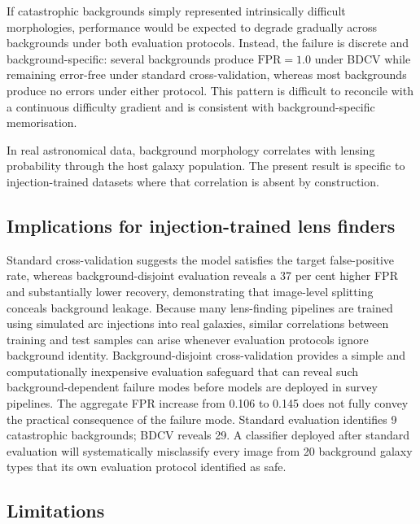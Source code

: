 \documentclass[fleqn,usenatbib]{mnras}
\begin{document}
If catastrophic backgrounds simply represented intrinsically difficult
morphologies, performance would be expected to degrade gradually across
backgrounds under both evaluation protocols. Instead, the failure is
discrete and background-specific: several backgrounds produce
$\mathrm{FPR} = 1.0$ under BDCV while remaining error-free under
standard cross-validation, whereas most backgrounds produce no errors
under either protocol. This pattern is difficult to reconcile with a
continuous difficulty gradient and is consistent with
background-specific memorisation.

In real astronomical data, background morphology correlates with lensing
probability through the host galaxy population. The present result is
specific to injection-trained datasets where that correlation is absent
by construction.

\subsection{Implications for injection-trained lens finders}
\label{sec:implications}

Standard cross-validation suggests the model satisfies the target
false-positive rate, whereas background-disjoint evaluation reveals a 37
per cent higher FPR and substantially lower recovery, demonstrating that
image-level splitting conceals background leakage. Because many
lens-finding pipelines are trained using simulated arc injections into
real galaxies, similar correlations between training and test samples can
arise whenever evaluation protocols ignore background identity.
Background-disjoint cross-validation provides a simple and
computationally inexpensive evaluation safeguard that can reveal such
background-dependent failure modes before models are deployed in survey
pipelines. The aggregate FPR increase from 0.106 to 0.145 does not fully
convey the practical consequence of the failure mode. Standard evaluation
identifies 9 catastrophic backgrounds; BDCV reveals 29. A classifier
deployed after standard evaluation will systematically misclassify every
image from 20 background galaxy types that its own evaluation protocol
identified as safe.

\subsection{Limitations}
\label{sec:limitations}
\end{document}
